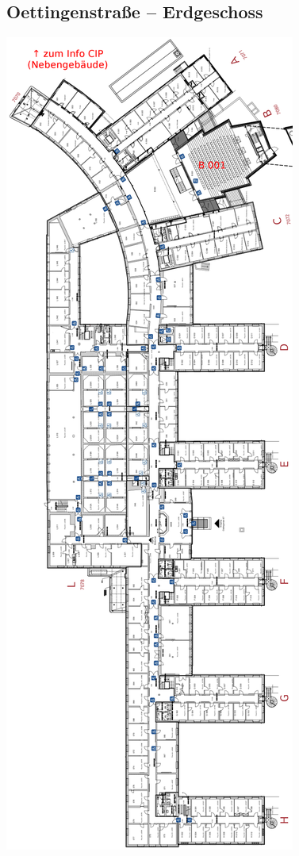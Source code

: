 \documentclass[twoside,12pt,parskip=half-]{scrartcl}
\begin{document}
\begin{center}
\subsection{Oettingenstraße -- Erdgeschoss}

\includegraphics[height=0.9\textheight]{oettingen.png}


\end{center}
\end{document}
